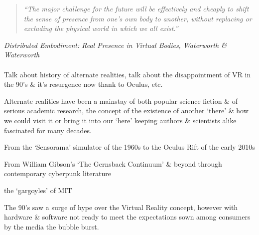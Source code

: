 \begin{quote}
	\textit{``The major challenge for the future will be effectively and cheaply to shift the sense of presence from one's own body to another, without replacing or excluding the physical world in which we all exist.''}
\end{quote}
\hfill \textit{Distributed Embodiment: Real Presence in Virtual Bodies, Waterworth \& Waterworth}
\\
\\



Talk about history of alternate realities, talk about the disappointment of VR in the 90's \& it's resurgence now thank to Oculus, etc.






Alternate realities have been a mainstay of both popular science fiction \& of serious academic research, the concept of the existence of another `there' \& how we could visit it or bring it into our `here'
keeping authors \& scientists alike fascinated for many decades.

From the `Sensorama' simulator of the 1960s to the Oculus Rift of the early 2010s

From William Gibson's `The Gernsback Continuum' \& beyond through contemporary cyberpunk literature

the `gargoyles' of MIT


The 90's saw a surge of hype over the Virtual Reality concept, however with hardware \& software not ready to meet the expectations sown among consumers by the media the bubble burst.

